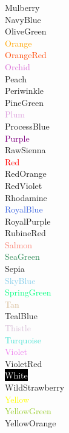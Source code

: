 \documentclass{article}
\begin{document}
	\textcolor{Mulberry}{Mulberry}\\
	\textcolor{NavyBlue}{NavyBlue}\\
	\textcolor{OliveGreen}{OliveGreen}\\
	\textcolor{Orange}{Orange}\\
	\textcolor{OrangeRed}{OrangeRed}\\
	\textcolor{Orchid}{Orchid}\\
	\textcolor{Peach}{Peach}\\
	\textcolor{Periwinkle}{Periwinkle}\\
	\textcolor{PineGreen}{PineGreen}\\
	\textcolor{Plum}{Plum}\\
	\textcolor{ProcessBlue}{ProcessBlue}\\
	\textcolor{Purple}{Purple}\\
	\textcolor{RawSienna}{RawSienna}\\
	\textcolor{Red}{Red}\\
	\textcolor{RedOrange}{RedOrange}\\
	\textcolor{RedViolet}{RedViolet}\\
	\textcolor{Rhodamine}{Rhodamine}\\
	\textcolor{RoyalBlue}{RoyalBlue}\\
	\textcolor{RoyalPurple}{RoyalPurple}\\
	\textcolor{RubineRed}{RubineRed}\\
	\textcolor{Salmon}{Salmon}\\
	\textcolor{SeaGreen}{SeaGreen}\\
	\textcolor{Sepia}{Sepia}\\
	\textcolor{SkyBlue}{SkyBlue}\\
	\textcolor{SpringGreen}{SpringGreen}\\
	\textcolor{Tan}{Tan}\\
	\textcolor{TealBlue}{TealBlue}\\
	\textcolor{Thistle}{Thistle}\\
	\textcolor{Turquoise}{Turquoise}\\
	\textcolor{Violet}{Violet}\\
	\textcolor{VioletRed}{}VioletRed\\
	\colorbox{black}{\textcolor{White}{White}}\\
	\textcolor{WildStrawberry}{WildStrawberry}\\
	\textcolor{Yellow}{Yellow}\\
	\textcolor{YellowGreen}{YellowGreen}\\
	\textcolor{YellowOrange}{YellowOrange}\\
	
\end{document}
